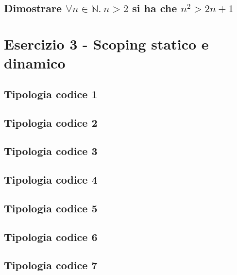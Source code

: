 \documentclass[a4paper]{article}
\begin{document}
	\subsection{Dimostrare $\forall n \in \mathbb{N}. \: n > 2$ si ha che $n^{2} > 2n + 1$}
	
	\section{Esercizio 3 - Scoping statico e dinamico}
	
	\subsection{Tipologia codice 1}
	
	
	\subsection{Tipologia codice 2}
	
	
	\subsection{Tipologia codice 3}
	
	
	\subsection{Tipologia codice 4}
	
	
	\subsection{Tipologia codice 5}
	
	
	\subsection{Tipologia codice 6}
	
	
	\subsection{Tipologia codice 7}
	
	
\end{document}
